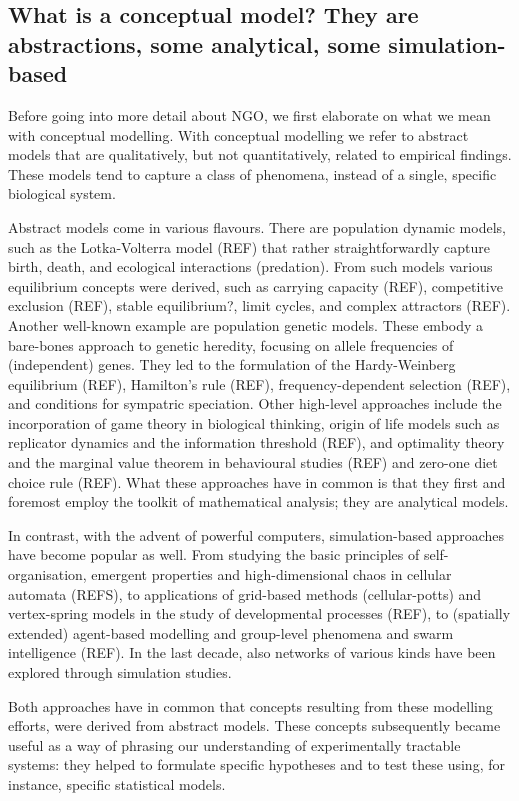 \subsection{What is a conceptual model? They are abstractions, some analytical, some simulation-based}

Before going into more detail about NGO, we first elaborate on what we mean with conceptual modelling. With conceptual modelling we refer to abstract models that are qualitatively, but not quantitatively, related to empirical findings. These models tend to capture a class of phenomena, instead of a single, specific biological system.

Abstract models come in various flavours. There are population dynamic models, such as the Lotka-Volterra model (REF) that rather straightforwardly capture birth, death, and ecological interactions (predation). From such models various equilibrium concepts were derived, such as carrying capacity (REF), competitive exclusion (REF), stable equilibrium?, limit cycles, and complex attractors (REF). Another well-known example are population genetic models. These embody a bare-bones approach to genetic heredity, focusing on allele frequencies of (independent) genes. They led to the formulation of the Hardy-Weinberg equilibrium (REF), Hamilton’s rule (REF), frequency-dependent selection (REF), and conditions for sympatric speciation. Other high-level approaches include the incorporation of game theory in biological thinking, origin of life models such as replicator dynamics and the information threshold (REF), and optimality theory and the marginal value theorem in behavioural studies (REF) and zero-one diet choice rule (REF). What these approaches have in common is that they first and foremost employ the toolkit of mathematical analysis; they are analytical models.

In contrast, with the advent of powerful computers, simulation-based approaches have become popular as well. From studying the basic principles of self-organisation, emergent properties and high-dimensional chaos in cellular automata (REFS), to applications of grid-based methods (cellular-potts) and vertex-spring models in the study of developmental processes (REF), to (spatially extended) agent-based modelling and group-level phenomena and swarm intelligence (REF). In the last decade, also networks of various kinds have been explored through simulation studies.

Both approaches have in common that concepts resulting from these modelling efforts, were derived from abstract models. These concepts subsequently became useful as a way of phrasing our understanding of experimentally tractable systems: they helped to formulate specific hypotheses and to test these using, for instance, specific statistical models.
  
